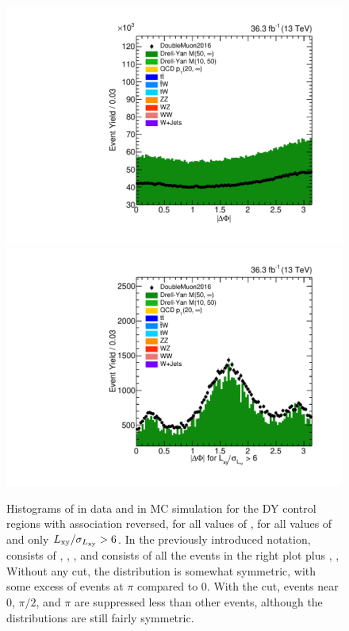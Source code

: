 \begin{figure}[t]
  \centering
  \includegraphics[width=\DSquareWidth]{figures/displaced/BGEST_NOPAT_deltaPhi_Lin.pdf}
  \hspace*{-2em}
  \includegraphics[width=\DSquareWidth]{figures/displaced/BGEST_NOPAT_deltaPhi-Big_Lin.pdf}
  \caption[Histograms of \DeltaPhi in data and in MC simulation for the DY control regions with \DSAToPAT association reversed, for all values of \DeltaPhi, for all values of \LxySig and for $\LxySig > 6$.]{Histograms of \DeltaPhi in data and in MC simulation for the DY control regions with \DSAToPAT association reversed, for all values of \DeltaPhi, for  all values of \LxySig and  only $\LxySig > 6$. In the previously introduced notation,  consists of , , \etc, and  consists of all the events in the right plot plus , , \etc Without any \LxySig cut, the distribution is somewhat symmetric, with some excess of events at $\pi$ compared to 0. With the \LxySig cut, events near 0, $\pi/2$, and $\pi$ are suppressed less than other events, although the distributions are still fairly symmetric.}
  \label{fig:dd:BGDeltaPhi_NoPAT}
\end{figure}

